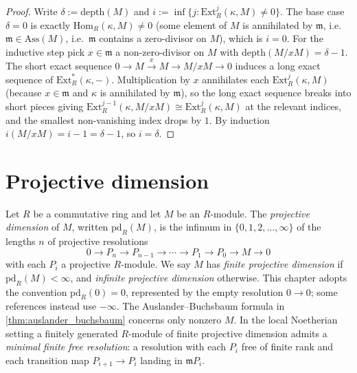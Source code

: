 \begin{proof}





\leanok
  Write \(\delta := \text{depth}(M)\) and \(i := \inf\{ j : \text{Ext}^j_R(\kappa, M) \neq 0 \}\).
  The base case \(\delta = 0\) is exactly \(\text{Hom}_R(\kappa, M) \neq 0\) (some element of
  \(M\) is annihilated by \(\mathfrak{m}\), i.e.\ \(\mathfrak{m} \in \text{Ass}(M)\), i.e.\
  \(\mathfrak{m}\) contains a zero-divisor on \(M\)), which is \(i = 0\). For the inductive step
  pick \(x \in \mathfrak{m}\) a non-zero-divisor on \(M\) with
  \(\text{depth}(M/xM) = \delta - 1\). The short exact sequence
  \(0 \to M \xrightarrow{x} M \to M/xM \to 0\) induces a long exact sequence of \(\text{Ext}^*_R(\kappa,
  -)\). Multiplication by \(x\) annihilates each \(\text{Ext}^j_R(\kappa, M)\) (because
  \(x \in \mathfrak{m}\) and \(\kappa\) is annihilated by \(\mathfrak{m}\)), so the long exact
  sequence breaks into short pieces giving
  \(\text{Ext}^{j-1}_R(\kappa, M/xM) \cong \text{Ext}^j_R(\kappa, M)\) at the relevant
  indices, and the smallest non-vanishing index drops by \(1\). By induction
  \(i(M/xM) = i - 1 = \delta - 1\), so \(i = \delta\).
\end{proof}

\section{Projective dimension}
\label{sec:ab_pd}

\begin{definition}[Projective dimension]\leanok
  \label{def:projective_dimension}
  Let \(R\) be a commutative ring and let \(M\) be an \(R\)-module. The \emph{projective
  dimension} of \(M\), written \(\text{pd}_R(M)\), is the infimum in
  \(\{0, 1, 2, \dots, \infty\}\) of the lengths \(n\) of projective resolutions
  \[
    0 \longrightarrow P_n \longrightarrow P_{n-1} \longrightarrow \cdots
    \longrightarrow P_1 \longrightarrow P_0 \longrightarrow M \longrightarrow 0
  \]
  with each \(P_i\) a projective \(R\)-module. We say \(M\) has \emph{finite projective dimension}
  if \(\text{pd}_R(M) < \infty\), and \emph{infinite projective dimension} otherwise.
  This chapter adopts the convention \(\text{pd}_R(0)=0\), represented by the empty
  resolution \(0 \to 0\); some references instead use \(-\infty\). The
  Auslander--Buchsbaum formula in \cref{thm:auslander_buchsbaum} concerns only nonzero \(M\).
  In the local Noetherian setting a finitely generated \(R\)-module of finite projective
  dimension admits a \emph{minimal finite free resolution}: a resolution with each \(P_i\)
  free of finite rank and each transition map \(P_{i+1} \to P_i\) landing in \(\mathfrak{m} P_i\).
\end{definition}

